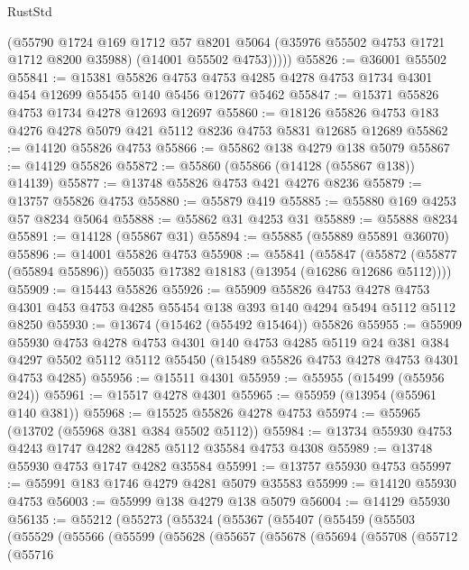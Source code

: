 \begin{lexlean}{RustStd}
\begin{coremodule}
          (@55790
            @1724
            @169
            @1712
            @57
            @8201
            @5064
            (@35976 @55502 @4753 @1721 @1712 @8200 @35988)
            (@14001 @55502 @4753)))))
@55826 := @36001 @55502
@55841 := @15381
    @55826
    @4753
    @4753
    @4285
    @4278
    @4753
    @1734
    @4301
    @454
    @12699
    @55455
    @140
    @5456
    @12677
    @5462
@55847 := @15371 @55826 @4753 @1734 @4278 @12693 @12697
@55860 := @18126 @55826 @4753 @183 @4276 @4278 @5079 @421 @5112 @8236 @4753 @5831 @12685 @12689
@55862 := @14120 @55826 @4753
@55866 := @55862 @138 @4279 @138 @5079
@55867 := @14129 @55826
@55872 := @55860 (@55866 (@14128 (@55867 @138)) @14139)
@55877 := @13748 @55826 @4753 @421 @4276 @8236
@55879 := @13757 @55826 @4753
@55880 := @55879 @419
@55885 := @55880 @169 @4253 @57 @8234 @5064
@55888 := @55862 @31 @4253 @31
@55889 := @55888 @8234
@55891 := @14128 (@55867 @31)
@55894 := @55885 (@55889 @55891 @36070)
@55896 := @14001 @55826 @4753
@55908 := @55841
    (@55847 (@55872 (@55877 (@55894 @55896)) @55035 @17382 @18183 (@13954 (@16286 @12686 @5112))))
@55909 := @15443 @55826
@55926 := @55909
    @55826
    @4753
    @4278
    @4753
    @4301
    @453
    @4753
    @4285
    @55454
    @138
    @393
    @140
    @4294
    @5494
    @5112
    @5112
    @8250
@55930 := @13674 (@15462 (@55492 @15464)) @55826
@55955 := @55909
    @55930
    @4753
    @4278
    @4753
    @4301
    @140
    @4753
    @4285
    @5119
    @24
    @381
    @384
    @4297
    @5502
    @5112
    @5112
    @55450
    (@15489 @55826 @4753 @4278 @4753 @4301 @4753 @4285)
@55956 := @15511 @4301
@55959 := @55955 (@15499 (@55956 @24))
@55961 := @15517 @4278 @4301
@55965 := @55959 (@13954 (@55961 @140 @381))
@55968 := @15525 @55826 @4278 @4753
@55974 := @55965 (@13702 (@55968 @381 @384 @5502 @5112))
@55984 := @13734 @55930 @4753 @4243 @1747 @4282 @4285 @5112 @35584 @4753 @4308
@55989 := @13748 @55930 @4753 @1747 @4282 @35584
@55991 := @13757 @55930 @4753
@55997 := @55991 @183 @1746 @4279 @4281 @5079 @35583
@55999 := @14120 @55930 @4753
@56003 := @55999 @138 @4279 @138 @5079
@56004 := @14129 @55930
@56135 := @55212
    (@55273
      (@55324
        (@55367
          (@55407
            (@55459
              (@55503
                (@55529
                  (@55566
                    (@55599
                      (@55628
                        (@55657
                          (@55678
                            (@55694
                              (@55708
                                (@55712
                                  (@55716

\end{coremodule}
\end{lexlean}
